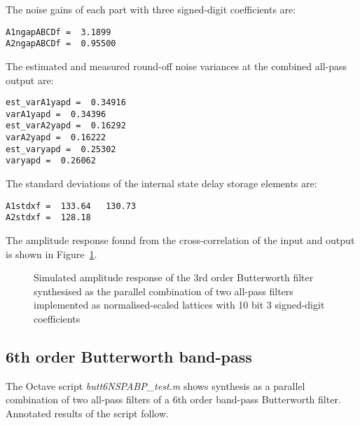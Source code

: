 \documentclass[a4paper,twoside,10pt,english]{report}
\begin{document}
The noise gains of each part with three signed-digit coefficients are:
\begin{small}
\begin{verbatim}
A1ngapABCDf =  3.1899
A2ngapABCDf =  0.95500
\end{verbatim}
\end{small}
The estimated and measured round-off noise variances at the combined all-pass
output are:
\begin{small}
\begin{verbatim}
est_varA1yapd =  0.34916
varA1yapd =  0.34396
est_varA2yapd =  0.16292
varA2yapd =  0.16222
est_varyapd =  0.25302
varyapd =  0.26062
\end{verbatim}
\end{small}
The standard deviations of the internal state delay storage elements are:
\begin{small}
\begin{verbatim}
A1stdxf =  133.64   130.73
A2stdxf =  128.18
\end{verbatim}
\end{small}
The amplitude response found from the cross-correlation of the input
and output is shown in
Figure~\ref{fig:Butt3NSPA_combined_allpass_output_response}.
\begin{figure}[!htbp]
\begin{center}
\scalebox{0.7}{}
\caption{Simulated amplitude response of the 3rd order Butterworth filter 
synthesised as the parallel combination of two all-pass filters
implemented as normalised-scaled lattices with 10 bit 3 signed-digit
coefficients}
\label{fig:Butt3NSPA_combined_allpass_output_response}
\end{center}
\end{figure}
\subsection{6th order Butterworth band-pass}
The Octave script \emph{butt6NSPABP\_test.m} shows synthesis as a parallel 
combination of two all-pass filters of a 6th order band-pass Butterworth filter. 
Annotated results of the script follow.
\end{document}
